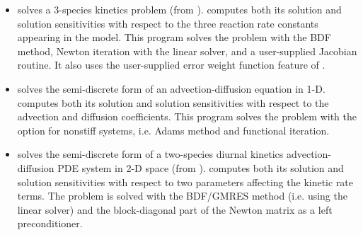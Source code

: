 \begin{itemize}
\item {}
  solves a 3-species kinetics problem (from ).
  \newline
  {\cvodes} computes both its solution and solution sensitivities with respect
  to the three reaction rate constants appearing in the model. 
  This program solves the problem with the BDF method, Newton          
  iteration with the {\cvdense} linear solver, and a user-supplied    
  Jacobian routine. It also uses the user-supplied error
  weight function feature of {\cvodes}.
\item {}
  solves the semi-discrete form of an advection-diffusion equation in 1-D.
  \newline
  {\cvodes} computes both its solution and solution sensitivities with respect
  to the advection and diffusion coefficients.
  This program solves the problem with the option for nonstiff systems,
  i.e. Adams method and functional iteration.
\item {}
  solves the semi-discrete form of a two-species diurnal kinetics
  advection-diffusion PDE system in 2-D space (from ).
  \newline
  {\cvodes} computes both its solution and solution sensitivities with respect
  to two parameters affecting the kinetic rate terms.
  The problem is solved with the BDF/GMRES method (i.e. using the {\cvspgmr}
  linear solver) and the block-diagonal part of the  
  Newton matrix as a left preconditioner.



\end{itemize}
